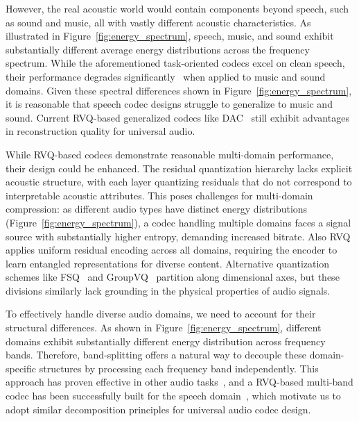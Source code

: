 \documentclass[11pt]{article}
\begin{document}
However, the real acoustic world would contain components beyond speech, such as sound and music, all with vastly different acoustic characteristics. As illustrated in Figure~\ref{fig:energy_spectrum}, speech, music, and sound exhibit substantially different average energy distributions across the frequency spectrum. While the aforementioned task-oriented codecs excel on clean speech, their performance degrades significantly~\cite{mousavi2025discrete} when applied to music and sound domains. Given these spectral differences shown in Figure~\ref{fig:energy_spectrum}, it is reasonable that speech codec designs struggle to generalize to music and sound. Current RVQ-based generalized codecs like DAC~\cite{kumar2023high} still exhibit advantages~\cite{mousavi2025discrete} in reconstruction quality for universal audio.

While RVQ-based codecs demonstrate reasonable multi-domain performance, their design could be enhanced. The residual quantization hierarchy lacks explicit acoustic structure, with each layer quantizing residuals that do not correspond to interpretable acoustic attributes. This poses challenges for multi-domain compression: as different audio types have distinct energy distributions (Figure~\ref{fig:energy_spectrum}), a codec handling multiple domains faces a signal source with substantially higher entropy, demanding increased bitrate. Also RVQ applies uniform residual encoding across all domains, requiring the encoder to learn entangled representations for diverse content. Alternative quantization schemes like FSQ~\cite{mentzer2023finite} and GroupVQ~\cite{yang2023hifi} partition along dimensional axes, but these divisions similarly lack grounding in the physical properties of audio signals.

To effectively handle diverse audio domains, we need to account for their structural differences. As shown in Figure~\ref{fig:energy_spectrum}, different domains exhibit substantially different energy distribution across frequency bands. Therefore, band-splitting offers a natural way to decouple these domain-specific structures by processing each frequency band independently. This approach has proven effective in other audio tasks~\cite{luo2023music, yang2021multi}, and a RVQ-based multi-band codec has been successfully built for the speech domain~\cite{ng2025multiband}, which motivate us to adopt similar decomposition principles for universal audio codec design.
\end{document}
